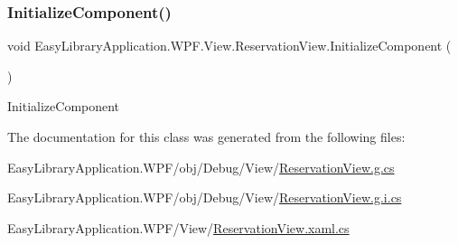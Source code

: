 \subsubsection{\texorpdfstring{Initialize\+Component()}{InitializeComponent()}\hspace{0.1cm}{\footnotesize\ttfamily [3/3]}}
{\footnotesize\ttfamily void Easy\+Library\+Application.\+W\+P\+F.\+View.\+Reservation\+View.\+Initialize\+Component (\begin{DoxyParamCaption}{ }\end{DoxyParamCaption})}



Initialize\+Component 



The documentation for this class was generated from the following files\+:\begin{DoxyCompactItemize}
\item 
Easy\+Library\+Application.\+W\+P\+F/obj/\+Debug/\+View/\mbox{\hyperlink{_debug_2_view_2_reservation_view_8g_8cs}{Reservation\+View.\+g.\+cs}}\item 
Easy\+Library\+Application.\+W\+P\+F/obj/\+Debug/\+View/\mbox{\hyperlink{_reservation_view_8g_8i_8cs}{Reservation\+View.\+g.\+i.\+cs}}\item 
Easy\+Library\+Application.\+W\+P\+F/\+View/\mbox{\hyperlink{_reservation_view_8xaml_8cs}{Reservation\+View.\+xaml.\+cs}}\end{DoxyCompactItemize}
